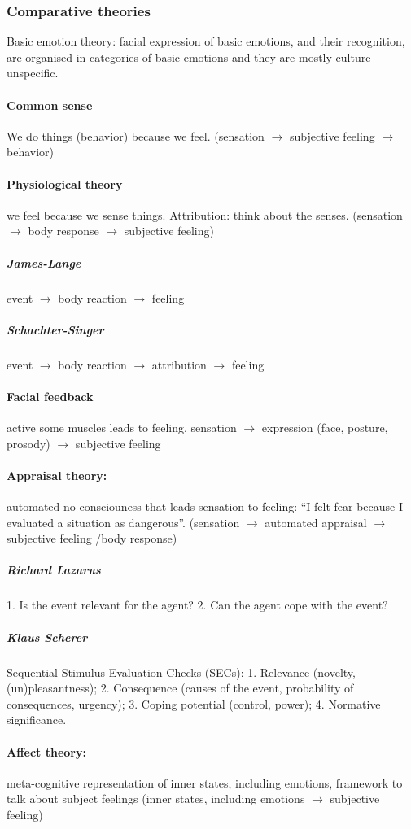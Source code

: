 \documentclass[12pt,article,oneside,a4paper]{memoir}
\begin{document}
\subsubsection{Comparative theories}
Basic emotion theory: facial expression of basic emotions, and their
recognition, are organised in categories of basic emotions and they are mostly
culture-unspecific.

\paragraph{Common sense}
We do things (behavior) because we feel.
(sensation $\rightarrow$ subjective feeling $\rightarrow$ behavior)
\paragraph{Physiological theory}
we feel because we sense things. Attribution: think about the senses.
(sensation $\rightarrow$ body response $\rightarrow$ subjective feeling)
\subparagraph{James-Lange} event $\rightarrow$ body reaction $\rightarrow$
feeling
\subparagraph{Schachter-Singer} event $\rightarrow$ body reaction $\rightarrow$
attribution $\rightarrow$ feeling
\paragraph{Facial feedback} active some muscles leads to feeling. sensation
$\rightarrow$ expression (face, posture, prosody) $\rightarrow$ subjective
feeling
\paragraph{Appraisal theory:} automated no-consciouness that leads sensation to
feeling: ``I felt fear because I evaluated a situation as dangerous''.
(sensation $\rightarrow$ automated appraisal $\rightarrow$ subjective feeling
/body response)
\subparagraph{Richard Lazarus} 1. Is the event relevant for the agent? 2.
Can the agent cope with the event?
\subparagraph{Klaus Scherer} Sequential Stimulus Evaluation Checks (SECs):
1. Relevance (novelty, (un)pleasantness); 2. Consequence (causes of the event,
probability of consequences, urgency); 3. Coping potential (control, power);
4. Normative significance.
\paragraph{Affect theory:} meta-cognitive representation of inner states,
including emotions, framework to talk about subject feelings (inner states,
including emotions $\rightarrow$ subjective feeling)
\end{document}
